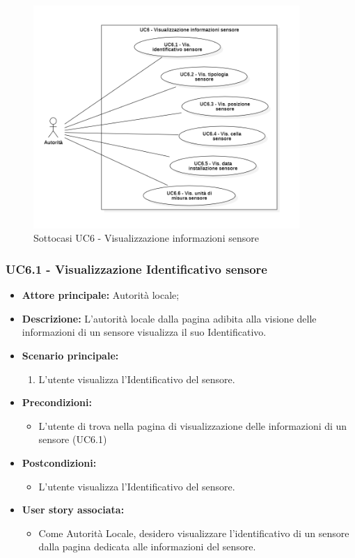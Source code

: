 \documentclass{article}
\begin{document}
\begin{figure}[H]
    \centering
    \includegraphics[width=0.9\textwidth]{Images/uc6_Subcase.PNG}
    \caption{Sottocasi UC6 - Visualizzazione informazioni sensore}
    \label{fig:UC6_sub}
\end{figure}

\subsubsection{UC6.1 - Visualizzazione Identificativo sensore}
\begin{itemize}
    \item \textbf{Attore principale:} Autorità locale;
    \item \textbf{Descrizione:} L’autorità locale dalla pagina adibita alla visione delle informazioni di un sensore visualizza il suo Identificativo.
    \item \textbf{Scenario principale:}
          \begin{enumerate}
              \item L'utente visualizza l'Identificativo del sensore.
          \end{enumerate}
    \item \textbf{Precondizioni:}
          \begin{itemize}
              \item  L'utente di trova nella pagina di visualizzazione delle informazioni di un sensore (UC6.1)
          \end{itemize}
    \item \textbf{Postcondizioni:}
          \begin{itemize}
              \item  L'utente visualizza l'Identificativo del sensore.
          \end{itemize}\item \textbf{User story associata:}
          \begin{itemize}
              \item Come Autorità Locale, desidero visualizzare l'identificativo di un sensore dalla pagina dedicata alle informazioni del sensore.
          \end{itemize}
\end{itemize}
\end{document}
